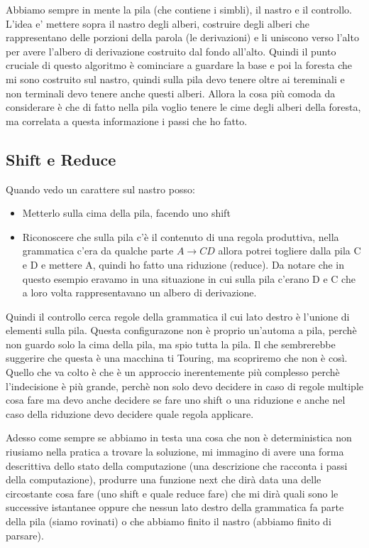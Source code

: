 Abbiamo sempre in mente la pila (che contiene i simbli), il nastro e il controllo. L'idea e' mettere sopra il nastro degli alberi, costruire degli alberi che rappresentano delle porzioni della parola (le derivazioni) e li uniscono verso l'alto per avere l'albero di derivazione costruito dal fondo all'alto. Quindi il punto cruciale di questo algoritmo è cominciare a guardare la base e poi la foresta che mi sono costruito sul nastro, quindi sulla pila devo tenere oltre ai tereminali e non terminali devo tenere anche questi alberi.
Allora la cosa più comoda da considerare è che di fatto nella pila voglio tenere le cime degli alberi della foresta, ma correlata a questa informazione i passi che ho fatto.

\subsection{Shift e Reduce}
Quando vedo un carattere sul nastro posso:
\begin{itemize}
  \item Metterlo sulla cima della pila, facendo uno shift
  \item Riconoscere che sulla pila c'è il contenuto di una regola produttiva, nella grammatica c'era da qualche parte $A \rightarrow CD$ allora potrei togliere dalla pila C e D e mettere A, quindi ho fatto una riduzione (reduce). Da notare che in questo esempio eravamo in una situazione in cui sulla pila c'erano D e C che a loro volta rappresentavano un albero di derivazione.
\end{itemize}

Quindi il controllo cerca regole della grammatica il cui lato destro è l'unione di elementi sulla pila. Questa configurazone non è proprio un'automa a pila, perchè non guardo solo la cima della pila, ma spio tutta la pila. Il che sembrerebbe suggerire che questa è una macchina ti Touring, ma scopriremo che non è così. Quello che va colto è che è un approccio inerentemente più complesso perchè l'indecisione è più grande, perchè non solo devo decidere in caso di regole multiple cosa fare ma devo anche decidere se fare uno shift o una riduzione e anche nel caso della riduzione devo decidere quale regola applicare.

Adesso come sempre se abbiamo in testa una cosa che non è deterministica non riusiamo nella pratica a trovare la soluzione, mi immagino di avere una forma descrittiva dello stato della computazione (una descrizione che racconta i passi della computazione), produrre una funzione next che dirà data una delle circostante cosa fare (uno shift e quale reduce fare) che mi dirà quali sono le successive istantanee oppure che nessun lato destro della grammatica fa parte della pila (siamo rovinati) o che abbiamo finito il nastro (abbiamo finito di parsare).

